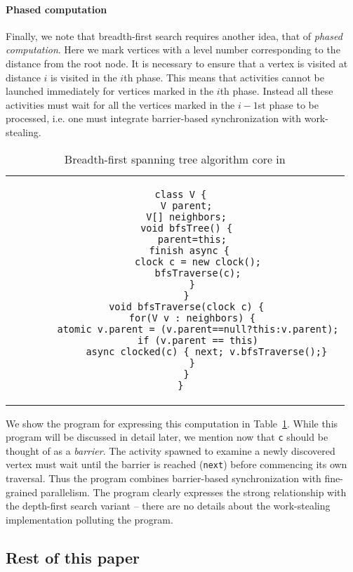 \paragraph{Phased computation}
Finally, we note that breadth-first search requires another idea, that
of {\em phased computation}. Here we mark vertices with a level number
corresponding to the distance from the root node. It is necessary to
ensure that a vertex is visited at distance $i$ is visited in the
$i$th phase. This means that activities cannot be launched immediately
for vertices marked in the $i$th phase. Instead all these activities
must wait for all the vertices marked in the $i-1$st phase to be
processed, i.e.{} one must integrate barrier-based synchronization
with work-stealing.

\begin{table}
\centering
\scriptsize
\begin{tabular}{c}
\begin{minipage}[t]{0.5\textwidth}
\begin{verbatim} 
  class V {
    V parent;
    V[] neighbors;
    void bfsTree() {
      parent=this;
      finish async { 
        clock c = new clock();
        bfsTraverse(c);
      }
    }
    void bfsTraverse(clock c) {
      for(V v : neighbors) {
        atomic v.parent = (v.parent==null?this:v.parent);
        if (v.parent == this)
           async clocked(c) { next; v.bfsTraverse();}
      }
    }
  }
\end{verbatim}
\end{minipage} 
\end{tabular}
\caption{Breadth-first spanning tree algorithm core in \Xten}
\label{alg:bfs-x10}
\end{table}

We show the program for expressing this computation in
Table~\ref{alg:bfs-x10}. While this program will be discussed in
detail later, we mention now that {\tt c} should be thought of as a
{\em barrier}. The activity spawned to examine a newly discovered
vertex must wait until the barrier is reached ({\tt next}) before
commencing its own traversal. Thus the program combines barrier-based
synchronization with fine-grained parallelism. The program clearly
expresses the strong relationship with the depth-first search variant
-- there are no details about the work-stealing implementation
polluting the program.

\subsection{Rest of this paper}

